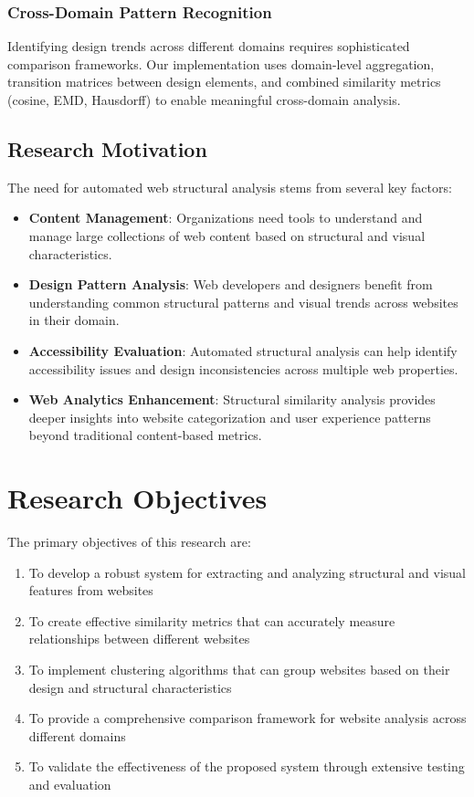 \subsubsection{Cross-Domain Pattern Recognition}
\label{subsec:cross-domain}
Identifying design trends across different domains requires sophisticated comparison frameworks. Our implementation uses domain-level aggregation, transition matrices between design elements, and combined similarity metrics (cosine, EMD, Hausdorff) to enable meaningful cross-domain analysis.


\subsection{Research Motivation}
\label{subsec:research-motivation}

The need for automated web structural analysis stems from several key factors:

\begin{itemize}
    \item \textbf{Content Management}: Organizations need tools to understand and manage large collections of web content based on structural and visual characteristics.
    
    \item \textbf{Design Pattern Analysis}: Web developers and designers benefit from understanding common structural patterns and visual trends across websites in their domain.
    
    \item \textbf{Accessibility Evaluation}: Automated structural analysis can help identify accessibility issues and design inconsistencies across multiple web properties.
    
    \item \textbf{Web Analytics Enhancement}: Structural similarity analysis provides deeper insights into website categorization and user experience patterns beyond traditional content-based metrics.
\end{itemize}

\section{Research Objectives}
\label{sec:objectives}

The primary objectives of this research are:

\begin{enumerate}
    \item To develop a robust system for extracting and analyzing structural and visual features from websites
    \item To create effective similarity metrics that can accurately measure relationships between different websites
    \item To implement clustering algorithms that can group websites based on their design and structural characteristics
    \item To provide a comprehensive comparison framework for website analysis across different domains
    \item To validate the effectiveness of the proposed system through extensive testing and evaluation
\end{enumerate}

